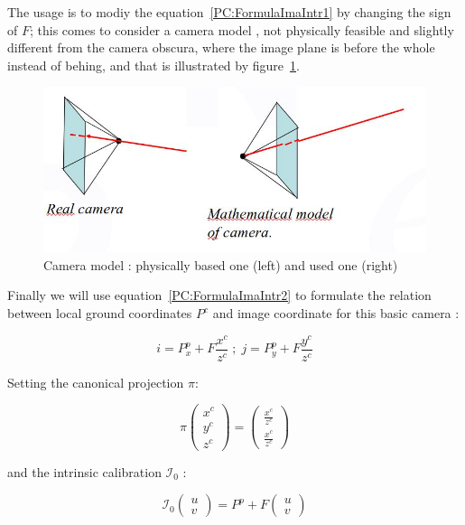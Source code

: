 The usage is to modiy the equation~\ref{PC:FormulaImaIntr1} by changing the sign of $F$;
this comes to consider a camera model ,
 not physically feasible and slightly different from the camera obscura,  
where the image plane is before the whole instead of behing, and that
is illustrated by figure~\ref{fig:PcInvCam}.  

\begin{figure}
\centering
\includegraphics[width=12cm]{Methods/Images/InvCamera.jpg}
	\caption{Camera model : physically based one (left) and used one (right)}
	\label{fig:PcInvCam}
\end{figure}

Finally we will use equation~\ref{PC:FormulaImaIntr2} to formulate the relation between
local ground coordinates $P^c$  and image coordinate for this basic camera :

\begin{equation}
	i = P^p_x +F \frac{x^c}{z^c}  \; ; \;
	j = P^p_y +F \frac{y^c}{z^c}  
	\label{PC:FormulaImaIntr2}
\end{equation}

Setting the canonical projection $\pi$:

\begin{equation}
	  \pi \begin{pmatrix} x^c \\ y^c \\ z^c \end{pmatrix} 
           =  \begin{pmatrix} \frac{x^c}{z^c} \\  \frac{x^c}{z^c}  \end{pmatrix} 
\end{equation}

and the intrinsic calibration $ \mathcal{I}_0$ :

\begin{equation}
	   \mathcal{I}_0  \begin{pmatrix} u \\  v  \end{pmatrix} 
        =  P^p + F  \begin{pmatrix} u \\  v  \end{pmatrix}
\end{equation}

